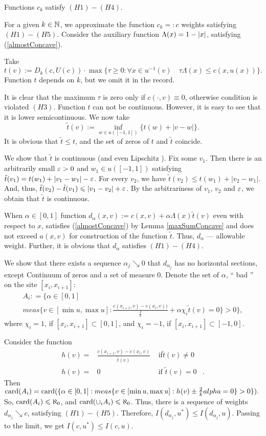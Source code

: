 Functions $c_k$ satisfy $(H1)-(H4)$.

For a given $k \in \mathbb N$, we approximate the function $c_k =: c$ weights satisfying $(H1)-(H5)$.
Consider the auxiliary function $\Lambda(x) = 1 - \left\vert x\right\vert$,
satisfying (\ref{almostConcave}).

Take
$$t(v):=D_k(c, U(c)) \cdot \max\{\tau \ge 0: \forall x \in u^{-1}(v) \quad \tau \Lambda(x) \le c(x, u(x))\}.$$
Function $t$ depends on $k$, but we omit it in the record.

It is clear that the maximum $\tau$ is zero only if $c(\cdot, v) \equiv 0$, otherwise condition is violated
$(H3)$.
Function $t$ can not be continuous. However, it is easy to see that it is lower semicontinuous.
We now take
$$\tilde{t}(v) := \inf_{w \in u([-1, 1])} \{t(w) + |v - w|\}.$$
It is obvious that $\tilde{t} \le t$, and the set of zeros of $t$ and $\tilde{t}$ coincide.

We show that $\tilde{t}$ is continuous (and even Lipschitz ).
Fix some $v_1$.
Then there is an arbitrarily small $\varepsilon > 0$ and $w_1 \in u([-1, 1])$
satisfying $\tilde{t}(v_1) = t(w_1) + |v_1 - w_1| - \varepsilon$.
For every $v_2$, we have $\tilde{t}(v_2) \le t(w_1) + |v_2 - w_1|$.
And, thus, $\tilde{t}(v_2) - \tilde{t}(v_1) \leqslant |v_1 - v_2| + \varepsilon$.
By the arbitrariness of $v_1$, $v_2$ and $\varepsilon$, we obtain that $\tilde{t}$ is continuous.

When $\alpha \in [0, 1]$ function $d_\alpha(x, v) := c(x, v) + \alpha \Lambda(x) \tilde{t}(v)$
even with respect to $x$, satisfies (\ref{almostConcave}) by Lemma \ref{maxSumConcave}
and does not exceed $a(x, v)$ for construction of the function $\tilde{t}$.
Thus, $d_\alpha$ --- allowable weight.
Further, it is obvious that $d_\alpha$ satisfies $(H1)-(H4)$.

We show that there exists a sequence $\alpha_j \searrow 0$
that $d_{\alpha_j}$ has no horizontal sections, except
Continuum of zeros and a set of measure $0$.
Denote the set of $\alpha$, `` bad '' on the site $[x_i, x_{i + 1}]$:
\begin{multline*}
A_i: = \big \{\alpha \in [ 0, 1 ] \\
meas \{v \in [\min u, \max u]: \frac{c (x_{i + 1}, v) - c (x_i, v))}{\frac{2}{k}} + \alpha \chi_i \tilde{t} (v) = 0 \} > 0 \big \},
\end{multline*}
where $\chi_i = 1$, if $[x_i, x_{i + 1}] \subset [0, 1]$, and $\chi_i = -1$, if $[x_i, x_{i + 1}] \subset [-1, 0]$.

Consider the function
$$
\begin{aligned}
h (v) = & \frac{c (x_{i + 1}, v) - c (x_i, v)}{\tilde{t} (v)} & \text{ if} \tilde{t} ( v) \neq 0 & \\
h (v) = & 0 & \text{ if } \tilde{t} (v) = 0 &.
\end{aligned}
$$
Then $\card(A_i) = \card(\{ \alpha \in [0, 1]: meas \{ v \in [\min u, \max u]: h(v) \pm \frac{2}{k}\\alpha = 0 \} > 0 \}).$
So, ${\rm card}(A_i) \leqslant \aleph_0$, and ${\rm card}(\cup_i A_i) \leqslant \aleph_0$.
Thus, there is a sequence of weights $d_{\alpha_j} \searrow c$, satisfying $(H1)-(H5)$.
Therefore, $I(d_{\alpha_j}, u^*) \le I(d_{\alpha_j}, u)$.
Passing to the limit, we get $I(c, u^*) \le I(c, u)$.

